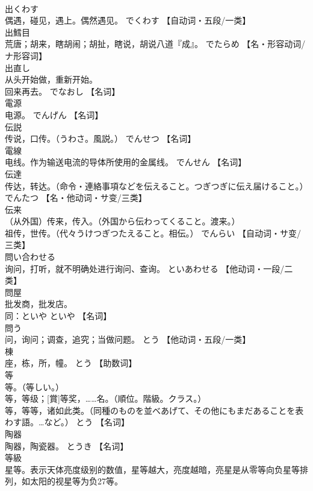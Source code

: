\documentclass[8pt]{extreport}
\begin{document}
\begin{CJK}{UTF8}{min}
\\	出くわす	
\\	偶遇，碰见，遇上。偶然遇见。	でくわす		【自动词・五段/一类】
\\	出鱈目	
\\	荒唐；胡来，瞎胡闹；胡扯，瞎说，胡说八道『成』。	でたらめ		【名・形容动词/ナ形容词】
\\	出直し	
\\	从头开始做，重新开始。 
\\	回来再去。	でなおし		【名词】
\\	電源	
\\	电源。	でんげん		【名词】
\\	伝説	
\\	传说，口传。（うわさ。風説。）	でんせつ		【名词】
\\	電線	
\\	电线。作为输送电流的导体所使用的金属线。	でんせん		【名词】
\\	伝達	
\\	传达，转达。（命令・連絡事項などを伝えること。つぎつぎに伝え届けること。）	でんたつ		【名・他动词・サ变/三类】
\\	伝来	
\\	（从外国）传来，传入。（外国から伝わってくること。渡来。） 
\\	祖传，世传。（代々うけつぎつたえること。相伝。）	でんらい		【自动词・サ变/三类】
\\	問い合わせる	
\\	询问，打听，就不明确处进行询问、查询。	といあわせる		【他动词・一段/二类】
\\	問屋	
\\	批发商，批发店。 
\\	同：といや	といや		【名词】
\\	問う	
\\	问，询问；调查，追究；当做问题。	とう		【他动词・五段/一类】
\\	棟	
\\	座，栋，所，幢。	とう		【助数词】
\\	等	
\\	等。（等しい。） 
\\	等，等级；[賞]等奖，……名。（順位。階級。クラス。） 
\\	等，等等，诸如此类。（同種のものを並べあげて、その他にもまだあることを表わす語。…など。）	とう		【名词】
\\	陶器	
\\	陶器，陶瓷器。	とうき		【名词】
\\	等級	
\\	星等。表示天体亮度级别的数值，星等越大，亮度越暗，亮星是从零等向负星等排列，如太阳的视星等为负27等。 

\end{CJK}
\end{document}
